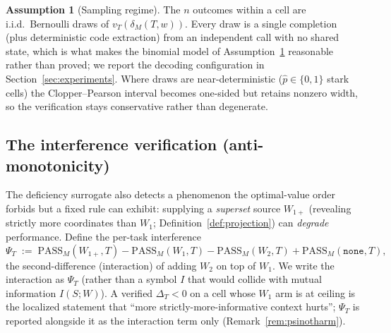 \documentclass[11pt]{article}
\theoremstyle{plain}
\theoremstyle{definition}
\newtheorem{assumption}{Assumption}
\theoremstyle{remark}
\newcommand{\PASS}{\mathrm{PASS}}
\begin{document}
\begin{assumption}[Sampling regime]
\label{ass:iid}
The $n$ outcomes within a cell are i.i.d.\ Bernoulli draws of $v_T(\delta_M(T,w))$. Every draw is a
single completion (plus deterministic code extraction) from an independent call with no shared
state, which is what makes the binomial model of Assumption~\ref{ass:iid} reasonable rather than proved; we report
the decoding configuration in Section~\ref{sec:experiments}. Where draws are near-deterministic
($\hat p\in\{0,1\}$ stark cells) the Clopper--Pearson interval becomes one-sided but retains
nonzero width, so the verification stays conservative rather than degenerate.
\end{assumption}

\subsection{The interference verification (anti-monotonicity)}
\label{subsec:interference}

The deficiency surrogate also detects a phenomenon the optimal-value order forbids but a fixed rule
can exhibit: supplying a \emph{superset} source $W_{1+}$ (revealing strictly more coordinates than
$W_1$; Definition~\ref{def:projection}) can \emph{degrade} performance. Define the per-task
interference
\begin{equation}
\label{eq:interference}
\Psi_T \;:=\; \PASS_M(W_{1+},T) - \PASS_M(W_1,T) - \PASS_M(W_2,T) + \PASS_M(\texttt{none},T),
\end{equation}
the second-difference (interaction) of adding $W_2$ on top of $W_1$. We write the interaction as
$\Psi_T$ (rather than a symbol $I$ that would collide with mutual information $I(S;W)$). A
verified $\Delta_T<0$ on a cell whose $W_1$ arm is at ceiling is the localized statement that
``more strictly-more-informative context hurts''; $\Psi_T$ is reported alongside it as the
interaction term only (Remark~\ref{rem:psinotharm}).
\end{document}
